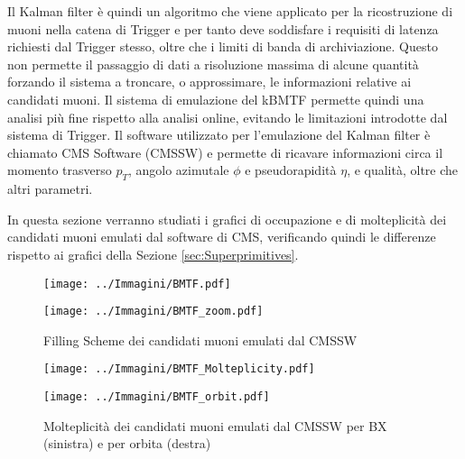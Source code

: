 Il Kalman filter è quindi un algoritmo che viene applicato per la ricostruzione di muoni nella catena di Trigger e per tanto deve soddisfare i requisiti di latenza richiesti dal Trigger stesso, oltre che i limiti di banda di archiviazione. Questo non permette il passaggio di dati a risoluzione massima di alcune quantità forzando il sistema a troncare, o approssimare, le informazioni relative ai candidati muoni. Il sistema di emulazione del kBMTF permette quindi una analisi più fine rispetto alla analisi online, evitando le limitazioni introdotte dal sistema di Trigger. Il software utilizzato per l'emulazione del Kalman filter è chiamato CMS Software (CMSSW) e permette di ricavare informazioni circa il momento trasverso $p_T$, angolo azimutale $\phi$ e pseudorapidità $\eta$, e qualità, oltre che altri parametri.

In questa sezione verranno studiati i grafici di occupazione e di molteplicità dei candidati muoni emulati dal software di CMS, verificando quindi le differenze rispetto ai grafici della Sezione \ref{sec:Superprimitives}.



\begin{figure}[t]
  \centering
  \begin{minipage}[b]{0.49\textwidth}
      \centering
      \texttt{[image: ../Immagini/BMTF.pdf]} 
    \end{minipage}
    \hfill 
    \begin{minipage}[b]{0.49\textwidth}
      \centering
      \texttt{[image: ../Immagini/BMTF\_zoom.pdf]} 
    \end{minipage}
    \caption{Filling Scheme dei candidati muoni emulati dal CMSSW}
  \label{fig:BMTFMuons}
\end{figure}

\begin{figure}[b]
  \centering
  \begin{minipage}[b]{0.49\textwidth}
      \centering
      \texttt{[image: ../Immagini/BMTF\_Molteplicity.pdf]} 
    \end{minipage}
    \hfill 
    \begin{minipage}[b]{0.49\textwidth}
      \centering
      \texttt{[image: ../Immagini/BMTF\_orbit.pdf]} 
    \end{minipage}
    \caption{Molteplicità dei candidati muoni emulati dal CMSSW per BX (sinistra) e per orbita (destra)}
  \label{fig:BMTFMolteplicity}
\end{figure}

